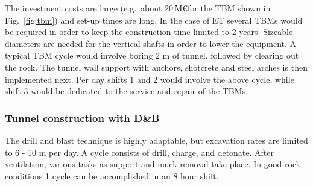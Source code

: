 The investment costs are large (e.g.\ about 20\,M\euro for the TBM shown in
Fig.~\ref{fig:tbm}) and set-up
times are long. In the case of ET several TBMs would be required in order to 
keep the construction time limited to 2 years. Sizeable diameters are needed for
the vertical shafts in order to lower the equipment. A typical TBM cycle would
involve boring 2 m of tunnel, followed by clearing out the rock. The tunnel wall support
with anchors, shotcrete and steel arches is then implemented next. Per day
shifts 1 and 2 would involve the above cycle, while shift 3 would be dedicated
to the service and repair of the TBMs.

\subsubsection*{Tunnel construction with D\&B}
 
The drill and blast technique is highly adaptable, but excavation rates are
limited to 6 - 10 m per day. A cycle consists of drill, charge, and detonate.
After ventilation, various tasks as support and muck removal take place. In good
rock conditions 1 cycle can be accomplished in an 8 hour shift.

